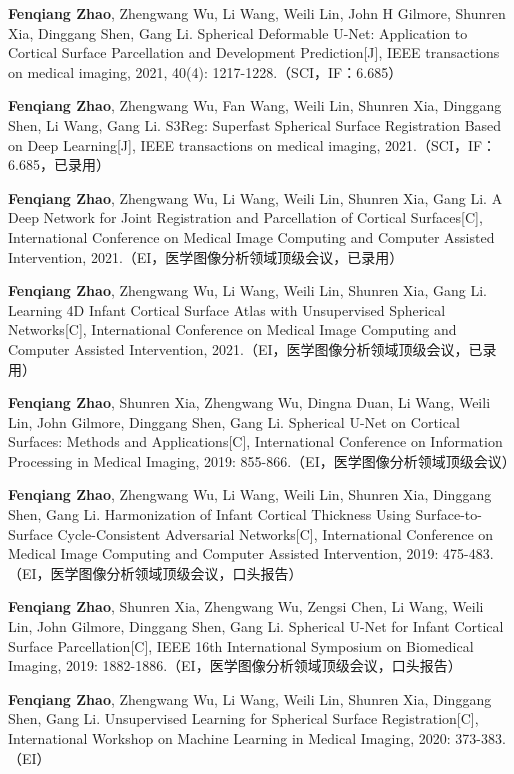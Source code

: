         {
        \noindent [1] \textbf{Fenqiang Zhao}, Zhengwang Wu, Li Wang, Weili Lin, John H Gilmore, Shunren Xia, Dinggang Shen, Gang Li. Spherical Deformable U-Net: Application to Cortical Surface Parcellation and Development Prediction[J], IEEE transactions on medical imaging, 2021, 40(4): 1217-1228.（SCI，IF：6.685）
        
        \noindent [2] \textbf{Fenqiang Zhao}, Zhengwang Wu, Fan Wang, Weili Lin, Shunren Xia, Dinggang Shen, Li Wang, Gang Li. S3Reg: Superfast Spherical Surface Registration Based on Deep Learning[J], IEEE transactions on medical imaging, 2021.（SCI，IF：6.685，已录用）
        
        \noindent [3] \textbf{Fenqiang Zhao}, Zhengwang Wu, Li Wang, Weili Lin, Shunren Xia, Gang Li. A Deep Network for Joint Registration and Parcellation of Cortical Surfaces[C], International Conference on Medical Image Computing and Computer Assisted Intervention, 2021.（EI，医学图像分析领域顶级会议，已录用）
        
        \noindent [4] \textbf{Fenqiang Zhao}, Zhengwang Wu, Li Wang, Weili Lin, Shunren Xia, Gang Li. Learning 4D Infant Cortical Surface Atlas with Unsupervised Spherical Networks[C], International Conference on Medical Image Computing and Computer Assisted Intervention, 2021.（EI，医学图像分析领域顶级会议，已录用）
        
        \noindent [5] \textbf{Fenqiang Zhao}, Shunren Xia, Zhengwang Wu, Dingna Duan, Li Wang, Weili Lin, John Gilmore, Dinggang Shen, Gang Li. Spherical U-Net on Cortical Surfaces: Methods and Applications[C], International Conference on Information Processing in Medical Imaging, 2019: 855-866.（EI，医学图像分析领域顶级会议）
        
        \noindent [6] \textbf{Fenqiang Zhao}, Zhengwang Wu, Li Wang, Weili Lin, Shunren Xia, Dinggang Shen, Gang Li. Harmonization of Infant Cortical Thickness Using Surface-to-Surface Cycle-Consistent Adversarial Networks[C], International Conference on Medical Image Computing and Computer Assisted Intervention, 2019: 475-483.（EI，医学图像分析领域顶级会议，口头报告）
        
        \noindent [7] \textbf{Fenqiang Zhao}, Shunren Xia, Zhengwang Wu, Zengsi Chen, Li Wang, Weili Lin, John Gilmore, Dinggang Shen, Gang Li. Spherical U-Net for Infant Cortical Surface Parcellation[C], IEEE 16th International Symposium on Biomedical Imaging, 2019: 1882-1886.（EI，医学图像分析领域顶级会议，口头报告）
        
        \noindent [8] \textbf{Fenqiang Zhao}, Zhengwang Wu, Li Wang, Weili Lin, Shunren Xia, Dinggang Shen, Gang Li. Unsupervised Learning for Spherical Surface Registration[C], International Workshop on Machine Learning in Medical Imaging, 2020: 373-383.（EI）
        
}
